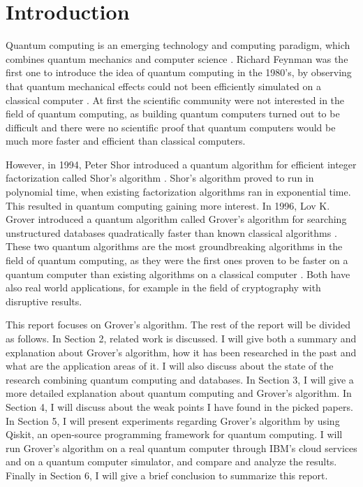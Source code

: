 \documentclass[english,oneside,openright]{UH_DS_report}
\begin{document}
\chapter{Introduction}
\label{chapter:intro}

Quantum computing is an emerging technology and computing paradigm, which combines quantum mechanics and computer science \cite{ambainis2004quantum, qcdb}. Richard Feynman was the first one to introduce the idea of quantum computing in the 1980's, by observing that quantum mechanical effects could not been efficiently simulated on a classical computer \cite{introtoqc}. At first the scientific community were not interested in the field of quantum computing, as building quantum computers turned out to be difficult and there were no scientific proof that quantum computers would be much more faster and efficient than classical computers. 

However, in 1994, Peter Shor introduced a quantum algorithm for efficient integer factorization called Shor's algorithm \cite{introtoqc}. Shor's algorithm proved to run in polynomial time, when existing factorization algorithms ran in exponential time. This resulted in quantum computing gaining more interest. In 1996, Lov K. Grover introduced a quantum algorithm called Grover's algorithm for searching unstructured databases quadratically faster than known classical algorithms \cite{grover1996fast}. These two quantum algorithms are the most groundbreaking algorithms in the field of quantum computing, as they were the first ones proven to be faster on a quantum computer than existing algorithms on a classical computer \cite{ambainis2004quantum}. Both have also real world applications, for example in the field of cryptography with disruptive results.

This report focuses on Grover's algorithm. The rest of the report will be divided as follows. In Section 2, related work is discussed. I will give both a summary and explanation about Grover's algorithm, how it has been researched in the past and what are the application areas of it. I will also discuss about the state of the research combining quantum computing and databases. In Section 3, I will give a more detailed explanation about quantum computing and Grover's algorithm. In Section 4, I will discuss about the weak points I have found in the picked papers. In Section 5, I will present experiments regarding Grover's algorithm by using Qiskit, an open-source programming framework for quantum computing. I will run Grover's algorithm on a real quantum computer through IBM's cloud services and on a quantum computer simulator, and compare and analyze the results. Finally in Section 6, I will give a brief conclusion to summarize this report.
\end{document}
